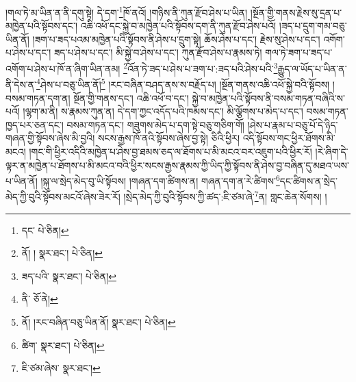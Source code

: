།གལ་ཏེ་མ་ཡིན་ན་ནི་དགུ་སྟེ། དེ་དག་\footnote{དང་  པེ་ཅིན། }ཁོ་ནའོ། །གཉིས་ནི་ཀུན་རྫོབ་ཤེས་པ་ཡིན། །སྔོན་གྱི་གནས་རྗེས་སུ་དྲན་པ་མཁྱེན་པའི་སྟོབས་དང་། འཆི་འཕོ་དང་སྐྱེ་བ་མཁྱེན་པའི་སྟོབས་དག་ནི་ཀུན་རྫོབ་ཤེས་པའོ། །ཟད་པ་དྲུག་གམ་བཅུ་ཡིན་ནོ། །ཟག་པ་ཟད་པའམ་མཁྱེན་པའི་སྟོབས་ནི་ཤེས་པ་དྲུག་སྟེ། ཆོས་ཤེས་པ་དང་། རྗེས་སུ་ཤེས་པ་དང་། འགོག་པ་ཤེས་པ་དང་། ཟད་པ་ཤེས་པ་དང་། མི་སྐྱེ་བ་ཤེས་པ་དང་། ཀུན་རྫོབ་ཤེས་པ་རྣམས་ཏེ། གལ་ཏེ་ཟག་པ་ཟད་པ་འགོག་པ་ཤེས་པ་ཁོ་ན་ཞིག་ཡིན་ནམ། \footnote{ནོ། །   སྣར་ཐང་།  པེ་ཅིན། }འོན་ཏེ་ཟད་པ་ཤེས་པ་ཟག་པ་:ཟད་པའི་ཤེས་པའི་\footnote{ཟད་པའི་  སྣར་ཐང་།  པེ་ཅིན། }རྒྱུད་ལ་ཡོད་པ་ཡིན་ན་ནི་དེས་ན་\footnote{ནི་  ཅོ་ནེ། }ཤེས་པ་བཅུ་ཡིན་ནོ།\footnote{ནོ། །རང་བཞིན་བཅུ་ཡིན་ནོ།  སྣར་ཐང་།  པེ་ཅིན། } །རང་བཞིན་བཤད་ནས་ས་བརྗོད་པ། །སྔོན་གནས་འཆི་འཕོ་སྐྱེ་བའི་སྟོབས། །བསམ་གཏན་དག་ན། སྔོན་གྱི་གནས་དང་། འཆི་འཕོ་བ་དང་། སྐྱེ་བ་མཁྱེན་པའི་སྟོབས་ནི་བསམ་གཏན་བཞིའི་ས་པའོ། །ལྷག་མ་ནི། ས་རྣམས་ཀུན་ན། དེ་དག་ཀྱང་འདོད་པའི་ཁམས་དང་། མི་ལྕོགས་པ་མེད་པ་དང་། བསམ་གཏན་ཁྱད་པར་ཅན་དང་། བསམ་གཏན་དང་། གཟུགས་མེད་པ་དག་སྟེ་བཅུ་གཅིག་གོ། །ཤེས་པ་རྣམ་པ་བཅུ་པོ་དེ་ཉིད་གཞན་གྱི་སྟོབས་ཞེས་མི་བྱའི། སངས་རྒྱས་ཁོ་ནའི་སྟོབས་ཞེས་བྱ་སྟེ། ཅིའི་ཕྱིར། འདི་སྟོབས་གང་ཕྱིར་ཐོགས་མི་མངའ། །གང་གི་ཕྱིར་འདིའི་མཁྱེན་པ་ཤེས་བྱ་ཐམས་ཅད་ལ་ཐོགས་པ་མི་མངའ་བར་འཇུག་པའི་ཕྱིར་རོ། །རེ་ཞིག་དེ་ལྟར་ན་མཁྱེན་པ་ཐོགས་པ་མི་མངའ་བའི་ཕྱིར་སངས་རྒྱས་རྣམས་ཀྱི་ཡིད་ཀྱི་སྟོབས་ནི་ཤེས་བྱ་བཞིན་དུ་མཐའ་ཡས་པ་ཡིན་ནོ། །སྐུ་ལ་སྲེད་མེད་བུ་ཡི་སྟོབས། །གཞན་དག་ཚིགས་ན། གཞན་དག་ན་རེ་ཚིགས་\footnote{ཚིག་  སྣར་ཐང་།  པེ་ཅིན། }དང་ཚིགས་ན་སྲེད་མེད་ཀྱི་བུའི་སྟོབས་མངའོ་ཞེས་ཟེར་རོ། །སྲེད་མེད་ཀྱི་བུའི་སྟོབས་ཀྱི་ཚད་:ཇི་ཙམ་ཞེ་\footnote{ཇི་ཙམ་ཞེས་  སྣར་ཐང་། }ན། གླང་ཆེན་སོགས། །

